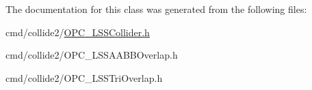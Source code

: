 The documentation for this class was generated from the following files\+:\begin{DoxyCompactItemize}
\item 
cmd/collide2/\hyperlink{OPC__LSSCollider_8h}{O\+P\+C\+\_\+\+L\+S\+S\+Collider.\+h}\item 
cmd/collide2/O\+P\+C\+\_\+\+L\+S\+S\+A\+A\+B\+B\+Overlap.\+h\item 
cmd/collide2/O\+P\+C\+\_\+\+L\+S\+S\+Tri\+Overlap.\+h\end{DoxyCompactItemize}
